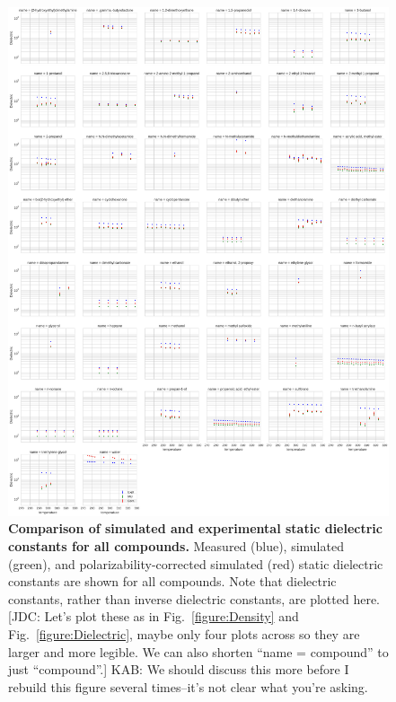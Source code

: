 \documentclass[aps,pre,twocolumn,nofootinbib,superscriptaddress,linenumbers]{revtex4-1}
\begin{document}
\begin{figure}

\includegraphics[width=\textwidth]{./figures/dielectric_versus_temperature_all.pdf}

\caption{{\bf Comparison of simulated and experimental static dielectric constants for all compounds.}
Measured (blue), simulated (green), and polarizability-corrected simulated (red) static dielectric constants are shown for all compounds.
Note that dielectric constants, rather than inverse dielectric constants, are plotted here.
{\color{red}[JDC: Let's plot these as in Fig.~\ref{figure:Density} and Fig.~\ref{figure:Dielectric}, maybe only four plots across so they are larger and more legible.  We can also shorten ``name = compound'' to just ``compound''.]
KAB: We should discuss this more before I rebuild this figure several times--it's not clear what you're asking.}
}
\label{figure:AllDielectrics}

\end{figure}
\end{document}
